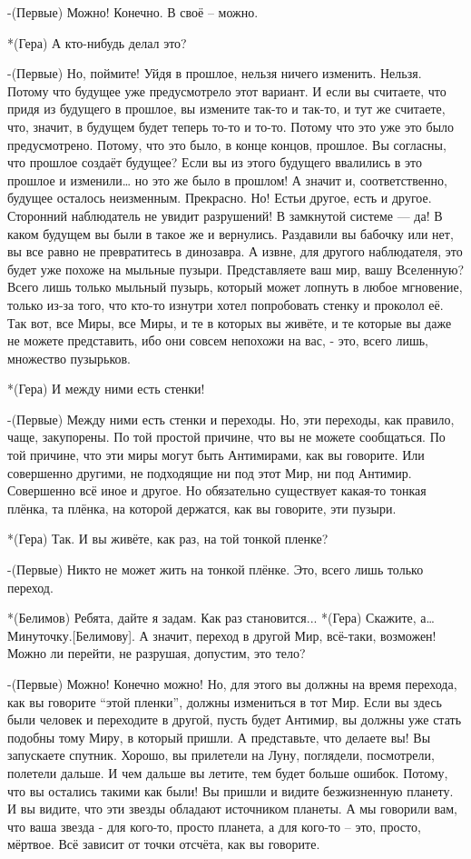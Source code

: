 -(Первые) Можно! Конечно. В своё – можно.

*(Гера) А кто-нибудь делал это?

-(Первые) Но, поймите! Уйдя в прошлое, нельзя ничего изменить. Нельзя. Потому что будущее уже предусмотрело этот вариант. И если вы считаете, что придя из будущего в прошлое, вы измените так-то и так-то, и тут же считаете, что, значит, в будущем будет теперь то-то и то-то. Потому что это уже это было предусмотрено. Потому, что это было, в конце концов, прошлое. Вы согласны, что прошлое создаёт будущее? Если вы из этого будущего ввалились в это прошлое и изменили… но это же было в прошлом! А значит и, соответственно, будущее осталось неизменным. Прекрасно. Но! Естьи другое, есть и другое. Сторонний наблюдатель не увидит разрушений! В замкнутой системе — да! В каком будущем вы были в такое же и вернулись. Раздавили вы бабочку или нет, вы все равно не превратитесь в динозавра. А извне, для другого наблюдателя, это будет уже похоже на мыльные пузыри. Представляете ваш мир, вашу Вселенную? Всего лишь только мыльный пузырь, который может лопнуть в любое мгновение, только из-за того, что кто-то изнутри хотел попробовать стенку и проколол её. Так вот, все Миры, все Миры, и те в которых вы живёте, и те которые вы даже не можете представить, ибо они совсем непохожи на вас, - это, всего лишь, множество пузырьков.

*(Гера) И между ними есть стенки!

-(Первые) Между ними есть стенки и переходы. Но, эти переходы, как правило, чаще, закупорены. По той простой причине, что вы не можете сообщаться. По той причине, что эти миры могут быть Антимирами, как вы говорите. Или совершенно другими, не подходящие ни под этот Мир, ни под Антимир. Совершенно всё иное и другое. Но обязательно существует какая-то тонкая плёнка, та плёнка, на которой держатся, как вы говорите, эти пузыри.

*(Гера) Так. И вы живёте, как раз, на той тонкой пленке?

-(Первые) Никто не может жить на тонкой плёнке. Это, всего лишь только переход.

*(Белимов) Ребята, дайте я задам. Как раз становится...
*(Гера) Скажите, а… Минуточку.[Белимову]. А значит, переход в другой Мир, всё-таки, возможен! Можно ли перейти, не разрушая, допустим, это тело?

-(Первые) Можно! Конечно можно! Но, для этого вы должны на время перехода, как вы говорите “этой пленки”,  должны измениться в тот Мир. Если вы здесь были человек и переходите в другой, пусть будет Антимир, вы должны уже стать подобны тому Миру, в который пришли. А представьте, что делаете вы! Вы запускаете спутник. Хорошо, вы прилетели на Луну, поглядели, посмотрели, полетели дальше. И чем дальше вы летите, тем будет больше ошибок. Потому, что вы остались такими как были! Вы пришли и видите безжизненную планету. И вы видите, что эти звезды обладают источником планеты. А мы говорили вам, что ваша звезда -  для кого-то, просто планета, а для кого-то – это, просто, мёртвое. Всё зависит от точки отсчёта, как вы говорите.


